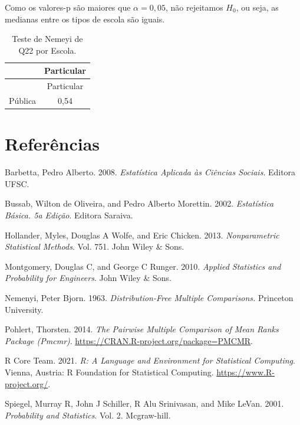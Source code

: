 \documentclass[]{article}
\begin{document}
Como os valores-p são maiores que \(\alpha=0,05\), não rejeitamos \(H_0\), ou seja, as medianas entre os tipos de escola são iguais.

\begin{longtable}[]{@{}lc@{}}
\caption{\label{tab:unnamed-chunk-405}Teste de Nemeyi de Q22 por Escola.}\tabularnewline
\toprule
& Particular\tabularnewline
\midrule
\endfirsthead
\toprule
& Particular\tabularnewline
\midrule
\endhead
Pública & 0,54\tabularnewline
\bottomrule
\end{longtable}

\cleardoublepage

\hypertarget{referuxeancias}{%
\section*{Referências}\label{referuxeancias}}

\hypertarget{refs}{}
\leavevmode\hypertarget{ref-barbetta2008estatistica}{}%
Barbetta, Pedro Alberto. 2008. \emph{Estatística Aplicada às Ciências Sociais}. Editora UFSC.

\leavevmode\hypertarget{ref-bussab2002estatistica}{}%
Bussab, Wilton de Oliveira, and Pedro Alberto Morettin. 2002. \emph{Estatística Básica. 5a Edição}. Editora Saraiva.

\leavevmode\hypertarget{ref-hollander2013nonparametric}{}%
Hollander, Myles, Douglas A Wolfe, and Eric Chicken. 2013. \emph{Nonparametric Statistical Methods}. Vol. 751. John Wiley \& Sons.

\leavevmode\hypertarget{ref-montgomery2010applied}{}%
Montgomery, Douglas C, and George C Runger. 2010. \emph{Applied Statistics and Probability for Engineers}. John Wiley \& Sons.

\leavevmode\hypertarget{ref-nemenyi1963distribution}{}%
Nemenyi, Peter Bjorn. 1963. \emph{Distribution-Free Multiple Comparisons.} Princeton University.

\leavevmode\hypertarget{ref-PMCMR}{}%
Pohlert, Thorsten. 2014. \emph{The Pairwise Multiple Comparison of Mean Ranks Package (Pmcmr)}. \url{https://CRAN.R-project.org/package=PMCMR}.

\leavevmode\hypertarget{ref-Rlang}{}%
R Core Team. 2021. \emph{R: A Language and Environment for Statistical Computing}. Vienna, Austria: R Foundation for Statistical Computing. \url{https://www.R-project.org/}.

\leavevmode\hypertarget{ref-spiegel2001probability}{}%
Spiegel, Murray R, John J Schiller, R Alu Srinivasan, and Mike LeVan. 2001. \emph{Probability and Statistics}. Vol. 2. Mcgraw-hill.
\end{document}
